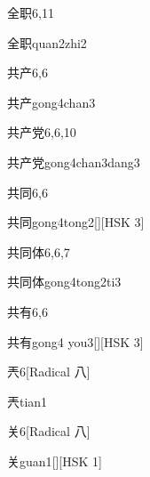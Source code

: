 \begin{entry}{全职}{6,11}
  \begin{phonetics}{全职}{quan2zhi2}
  \end{phonetics}
\end{entry}

\begin{entry}{共产}{6,6}
  \begin{phonetics}{共产}{gong4chan3}
  \end{phonetics}
\end{entry}

\begin{entry}{共产党}{6,6,10}
  \begin{phonetics}{共产党}{gong4chan3dang3}
  \end{phonetics}
\end{entry}

\begin{entry}{共同}{6,6}
  \begin{phonetics}{共同}{gong4tong2}[][HSK 3]
  \end{phonetics}
\end{entry}

\begin{entry}{共同体}{6,6,7}
  \begin{phonetics}{共同体}{gong4tong2ti3}
  \end{phonetics}
\end{entry}

\begin{entry}{共有}{6,6}
  \begin{phonetics}{共有}{gong4 you3}[][HSK 3]
  \end{phonetics}
\end{entry}

\begin{entry}{兲}{6}[Radical 八]
  \begin{phonetics}{兲}{tian1}
  \end{phonetics}
\end{entry}

\begin{entry}{关}{6}[Radical 八]
  \begin{phonetics}{关}{guan1}[][HSK 1]
  \end{phonetics}
\end{entry}

